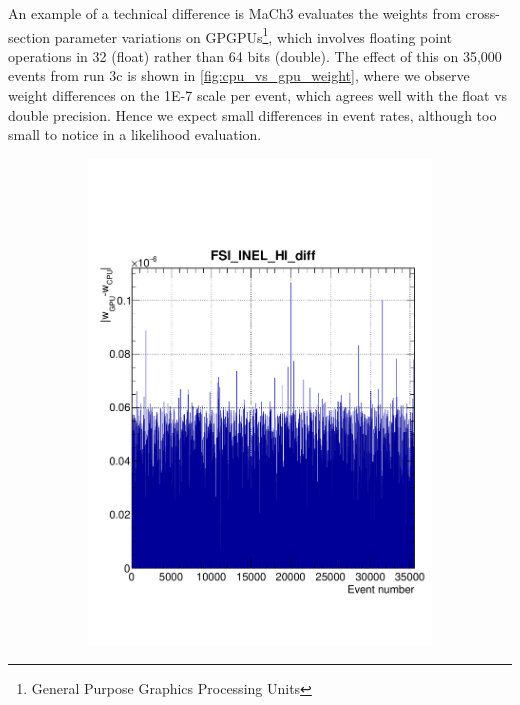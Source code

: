 An example of a technical difference is MaCh3 evaluates the weights from cross-section parameter variations on GPGPUs\footnote{General Purpose Graphics Processing Units}, which involves floating point operations in 32 (float) rather than 64 bits (double). The effect of this on 35,000 events from run 3c is shown in \autoref{fig:cpu_vs_gpu_weight}, where we observe weight differences on the 1E-7 scale per event, which agrees well with the float vs double precision. Hence we expect small differences in event rates, although too small to notice in a likelihood evaluation.
\begin{figure}[h]
	\begin{subfigure}[t]{0.45\textwidth}
		\includegraphics[width=\textwidth, trim={0mm 20mm 0mm 0mm}, clip, page=1]{figures/mach3/Asimov/fsi_inel_hi_diff}
	\end{subfigure}
	\begin{subfigure}[t]{0.45\textwidth}

\end{subfigure}
\end{figure}
